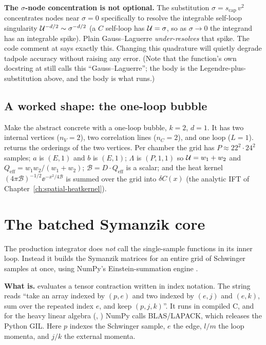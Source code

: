 \begin{gotcha}
\textbf{The $\sigma$-node concentration is not optional.} The substitution
$\sigma = s_{\text{cap}}\,v^2$ concentrates nodes near $\sigma = 0$
specifically to resolve the integrable self-loop singularity
$\mathcal{U}^{-d/2}\sim\sigma^{-d/2}$ (a $C$ self-loop has $\mathcal{U} = \sigma$, so as
$\sigma\to0$ the integrand has an integrable spike). Plain Gauss--Laguerre
\emph{under-resolves} that spike. The code comment at
 says exactly this. Changing this quadrature will
quietly degrade tadpole accuracy without raising any error. (Note that the
function's own docstring at  still calls this
``Gauss--Laguerre''; the body is the Legendre-plus-substitution above, and the
body is what runs.)
\end{gotcha}

\subsection{A worked shape: the one-loop bubble}

Make the abstract concrete with a one-loop bubble, $k=2$, $d=1$. It has two
internal vertices ($n_V=2$), two correlation lines ($n_C=2$), and one loop
($L=1$).  returns the orderings of the two
vertices. Per chamber the grid has $P \approx 22^2\cdot 24^2$ samples; $a$ is
$(E,1)$ and $b$ is $(E,1)$; $\Lambda$ is $(P,1,1)$ so $\mathcal{U} = w_1+w_2$ and
$Q_{\text{eff}} = w_1w_2/(w_1+w_2)$; $\mathcal{B} = D\cdot Q_{\text{eff}}$ is a
scalar; and the heat kernel $(4\pi\mathcal{B})^{-1/2}\ee^{-x^2/4\mathcal{B}}$ is
summed over the grid into $\delta C(x)$ (the analytic IFT of
Chapter~\ref{ch:spatial-heatkernel}).

\section{The batched Symanzik core}\label{sec:batched}

The production integrator does \emph{not} call the single-sample
 functions in its inner loop. Instead it builds the
Symanzik matrices for an entire grid of Schwinger samples at once, using NumPy's
Einstein-summation engine .

\begin{note}
\textbf{What  is.}  evaluates a tensor
contraction written in index notation. The string  reads
``take an array indexed by $(p,e)$ and two indexed by $(e,j)$ and $(e,k)$, sum over
the repeated index $e$, and keep $(p,j,k)$''. It runs in compiled C, and for the
heavy linear algebra (, ) NumPy calls BLAS/LAPACK, which
releases the Python GIL. Here $p$ indexes the Schwinger sample, $e$ the edge, $l/m$
the loop momenta, and $j/k$ the external momenta.
\end{note}

